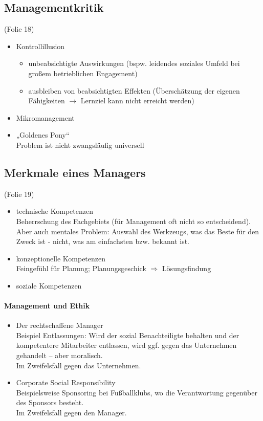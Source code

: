 \subsection{Managementkritik}
(Folie 18)
\begin{itemize}
\item Kontrollillusion
\begin{itemize}
\item unbeabsichtigte Auswirkungen (bspw. leidendes soziales Umfeld bei großem betrieblichen Engagement)
\item ausbleiben von beabsichtigten Effekten (Überschätzung der eigenen Fähigkeiten $\rightarrow$ Lernziel kann nicht erreicht werden)
\end{itemize}
\item Mikromanagement
\item „Goldenes Pony“\\
Problem ist nicht zwangsläufig universell
\end{itemize}
\subsection{Merkmale eines Managers}
(Folie 19)
\begin{itemize}
\item technische Kompetenzen\\
Beherrschung des Fachgebiets (für Management oft nicht so entscheidend). Aber auch mentales Problem: Auswahl des Werkzeugs, was das Beste für den Zweck ist - nicht, was am einfachsten bzw. bekannt ist.
\item konzeptionelle Kompetenzen\\
Feingefühl für Planung; Planungsgeschick $\Rightarrow$ Lösungsfindung
\item soziale Kompetenzen
\end{itemize}
\paragraph{Management und Ethik}
\begin{itemize}
\item Der rechtschaffene Manager\\
Beispiel Entlassungen: Wird der sozial Benachteiligte behalten und der kompetentere Mitarbeiter entlassen, wird ggf. gegen das Unternehmen gehandelt -- aber moralisch.\\
Im Zweifelsfall gegen das Unternehmen.
\item Corporate Social Responsibility\\
Beispielsweise Sponsoring bei Fußballklubs, wo die Verantwortung gegenüber des Sponsors besteht.\\
Im Zweifelsfall gegen den Manager.
\end{itemize}

